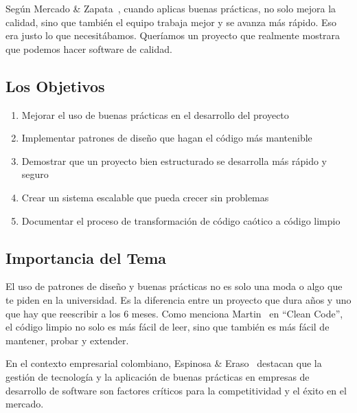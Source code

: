 Según Mercado \& Zapata~\cite{mercado2019revision}, cuando aplicas buenas prácticas, no solo mejora la calidad, sino que también el equipo trabaja mejor y se avanza más rápido. Eso era justo lo que necesitábamos. Queríamos un proyecto que realmente mostrara que podemos hacer software de calidad.

\subsection{Los Objetivos}

\begin{enumerate}
    \item Mejorar el uso de buenas prácticas en el desarrollo del proyecto
    \item Implementar patrones de diseño que hagan el código más mantenible
    \item Demostrar que un proyecto bien estructurado se desarrolla más rápido y seguro
    \item Crear un sistema escalable que pueda crecer sin problemas
    \item Documentar el proceso de transformación de código caótico a código limpio
\end{enumerate}

\subsection{Importancia del Tema}

El uso de patrones de diseño y buenas prácticas no es solo una moda o algo que te piden en la universidad. Es la diferencia entre un proyecto que dura años y uno que hay que reescribir a los 6 meses. Como menciona Martin~\cite{martin2008clean} en ``Clean Code'', el código limpio no solo es más fácil de leer, sino que también es más fácil de mantener, probar y extender.

En el contexto empresarial colombiano, Espinosa \& Eraso~\cite{espinosa2024gestion} destacan que la gestión de tecnología y la aplicación de buenas prácticas en empresas de desarrollo de software son factores críticos para la competitividad y el éxito en el mercado.